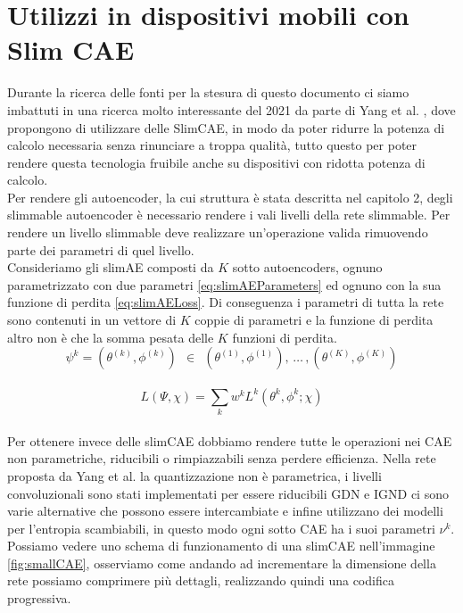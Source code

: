 \section{Utilizzi in dispositivi mobili con Slim CAE}

Durante la ricerca delle fonti per la stesura di questo documento ci siamo imbattuti in una ricerca molto interessante del 2021 da parte di Yang et al. \cite{yang2021slimmable}, dove propongono di utilizzare delle SlimCAE, in modo da poter ridurre la potenza di calcolo necessaria senza rinunciare a troppa qualità, tutto questo per poter rendere questa tecnologia fruibile anche su dispositivi con ridotta potenza di calcolo.\\
Per rendere gli autoencoder, la cui struttura è stata descritta nel capitolo 2, degli slimmable autoencoder è necessario rendere i vali livelli della rete slimmable. Per rendere un livello slimmable deve realizzare un’operazione valida rimuovendo parte dei parametri di quel livello.\\
Consideriamo gli slimAE composti da $K$ sotto autoencoders, ognuno parametrizzato con due parametri \ref{eq:slimAEParameters} ed ognuno con la sua funzione di perdita \ref{eq:slimAELoss}. Di conseguenza i parametri di tutta la rete sono contenuti in un vettore di $K$ coppie di parametri e la funzione di perdita altro non è che la somma pesata delle $K$ funzioni di perdita.\\
\begin{equation}\label{eq:slimAEParameters}
\psi^{k} = (\theta^{(k)},\phi^{(k)}) \:\: \in \:\: {(\theta^{(1)},\phi^{(1)}),\,…\, , (\theta^{(K)},\phi^{(K)})}
\end{equation}\\
\begin{equation}\label{eq:slimAELoss}
L(\Psi, \chi) = \sum_{k} w^{k} L^{k} (\theta^{k}, \phi^{k}; \chi)
\end{equation}\\
Per ottenere invece delle slimCAE dobbiamo rendere tutte le operazioni nei CAE non parametriche, riducibili o rimpiazzabili senza perdere efficienza. Nella rete proposta da Yang et al. la quantizzazione non è parametrica, i livelli convoluzionali sono stati implementati per essere riducibili GDN e IGND \cite{balle2018efficient} ci sono varie alternative che possono essere intercambiate e infine utilizzano dei modelli per l’entropia scambiabili, in questo modo ogni sotto CAE ha i suoi parametri $\nu^{k}$.\\
Possiamo vedere uno schema di funzionamento di una slimCAE nell’immagine \ref{fig:smallCAE}, osserviamo come andando ad incrementare la dimensione della rete possiamo comprimere più dettagli, realizzando quindi una codifica progressiva.\\
